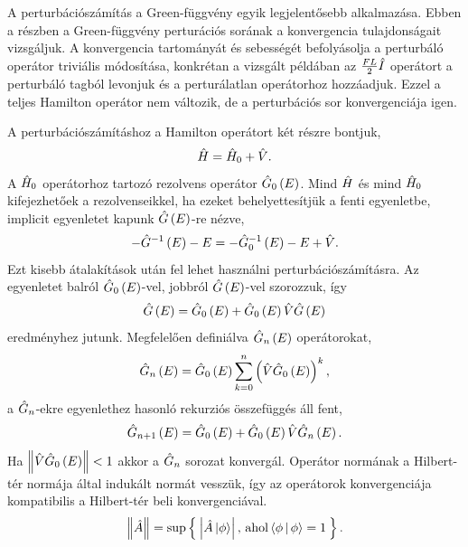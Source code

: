 A perturbációszámítás a Green-függvény egyik legjelentősebb alkalmazása. Ebben a részben a Green-függvény perturációs sorának a konvergencia tulajdonságait vizsgáljuk. A konvergencia tartományát és sebességét befolyásolja a perturbáló operátor triviális módosítása, konkrétan a vizsgált példában az $\frac{FL}{2}\hat{I}$ operátort a perturbáló tagból levonjuk és a perturálatlan operátorhoz hozzáadjuk. Ezzel a teljes Hamilton operátor nem változik, de a perturbációs sor konvergenciája igen.

A perturbációszámításhoz a Hamilton operátort két részre bontjuk,
\begin{equation}
	\hat{H} = \hat{H}_0 + \hat{V}.
\end{equation}
A $\hat{H}_0$ operátorhoz tartozó rezolvens operátor $\hat{G}_0\left(E\right)$. Mind $\hat{H}$ és mind $\hat{H}_0$ kifejezhetőek a rezolvenseikkel, ha ezeket behelyettesítjük a fenti egyenletbe, implicit egyenletet kapunk $\hat{G}\left(E\right)$-re nézve,
\begin{equation}
	-\hat{G}^{-1}\left(E\right) - E = -\hat{G}_0^{-1}\left(E\right) - E + \hat{V}.
\end{equation}
Ezt kisebb átalakítások után fel lehet használni perturbációszámításra. Az egyenletet balról $\hat{G}_0\left(E\right)$-vel, jobbról $\hat{G}\left(E\right)$-vel szorozzuk, így
\begin{equation}
	\hat{G}\left(E\right) = \hat{G}_0\left(E\right) + \hat{G}_0\left(E\right)\hat{V}\hat{G}\left(E\right)
	\label{green:pertmaster}
\end{equation}
eredményhez jutunk. Megfelelően definiálva $\hat{G}_n\left(E\right)$ operátorokat,
\begin{equation}
	\hat{G}_n\left(E\right) = \hat{G}_0\left(E\right)\sum_{k=0}^n\left(\hat{V}\hat{G}_0\left(E\right)\right)^k,
\end{equation}
a $\hat{G}_n$-ekre  egyenlethez hasonló rekurziós összefüggés áll fent,
\begin{equation}
	\hat{G}_{n+1}\left(E\right) = \hat{G}_0\left(E\right) + \hat{G}_0\left(E\right)\hat{V}\hat{G}_n\left(E\right).
	\label{perturbation:rekurzió}
\end{equation}
Ha $\left\lVert \hat{V}\hat{G}_0\left(E\right) \right\rVert < 1$ akkor a $\hat{G}_n$ sorozat konvergál. Operátor normának a Hilbert-tér normája által indukált normát vesszük, így az operátorok konvergenciája kompatibilis a Hilbert-tér beli konvergenciával.
\begin{equation}
	\left\lVert \hat{A} \right\rVert=\sup \Set{\left\lvert \hat{A}\Ket{\phi} \right\rvert \text{, ahol} \Braket{\phi|\phi}=1}.
\end{equation}
